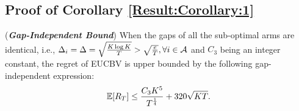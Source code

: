 %

\subsection{Proof of Corollary \ref{Result:Corollary:1}}
\label{App:Corollary:1}

\begin{customCorollary}{1}(\textbf{\textit{Gap-Independent Bound}})
When the gaps of all the sub-optimal arms are identical, i.e., $\Delta_i =\Delta = \sqrt{\frac{K\log K}{T}}>\sqrt{\frac{e}{T}}, \forall i\in \mathcal{A}$ and $C_3$ being an integer constant, the
regret of EUCBV is upper bounded by the following gap-independent expression:
\begin{align*}
	\mathbb{E}[R_{T}]\leq  \dfrac{C_3 K^5}{T^{\frac{1}{4}}} + 320\sqrt{KT}.
\end{align*}	
\end{customCorollary}


